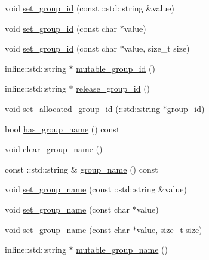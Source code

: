 \begin{DoxyCompactItemize}
\item 
void \hyperlink{class_i_m_1_1_base_define_1_1_client_group_info_ac25b09385a5addbb9d28868e7970514e}{set\+\_\+group\+\_\+id} (const \+::std\+::string \&value)
\item 
void \hyperlink{class_i_m_1_1_base_define_1_1_client_group_info_ad0ebe2257dc627dbbcb9a4d5d924f2cb}{set\+\_\+group\+\_\+id} (const char $\ast$value)
\item 
void \hyperlink{class_i_m_1_1_base_define_1_1_client_group_info_ac8af503be357ccc193ebcde38ae86fcd}{set\+\_\+group\+\_\+id} (const char $\ast$value, size\+\_\+t size)
\item 
inline\+::std\+::string $\ast$ \hyperlink{class_i_m_1_1_base_define_1_1_client_group_info_ae7f4ebffae493d221e762318c0ec7c51}{mutable\+\_\+group\+\_\+id} ()
\item 
inline\+::std\+::string $\ast$ \hyperlink{class_i_m_1_1_base_define_1_1_client_group_info_a24b89add60c216169886d76516211252}{release\+\_\+group\+\_\+id} ()
\item 
void \hyperlink{class_i_m_1_1_base_define_1_1_client_group_info_a7ff76a7c3c32bae9aa641df3a87e7b0e}{set\+\_\+allocated\+\_\+group\+\_\+id} (\+::std\+::string $\ast$\hyperlink{class_i_m_1_1_base_define_1_1_client_group_info_af803ccefa3b9c1e5ab16463f3eb9651e}{group\+\_\+id})
\item 
bool \hyperlink{class_i_m_1_1_base_define_1_1_client_group_info_a605c07708797f7b3347e385a4957a5dc}{has\+\_\+group\+\_\+name} () const 
\item 
void \hyperlink{class_i_m_1_1_base_define_1_1_client_group_info_a82d7bb5dbe1b50bb234113e0ae0f1577}{clear\+\_\+group\+\_\+name} ()
\item 
const \+::std\+::string \& \hyperlink{class_i_m_1_1_base_define_1_1_client_group_info_a63659cf89464b7b407fd30d261f8e35a}{group\+\_\+name} () const 
\item 
void \hyperlink{class_i_m_1_1_base_define_1_1_client_group_info_af276d3dade4bc188e519df90560ab2a2}{set\+\_\+group\+\_\+name} (const \+::std\+::string \&value)
\item 
void \hyperlink{class_i_m_1_1_base_define_1_1_client_group_info_a307cd3f55fac271b502eb201dd38da2c}{set\+\_\+group\+\_\+name} (const char $\ast$value)
\item 
void \hyperlink{class_i_m_1_1_base_define_1_1_client_group_info_a666dddbf2b07717cd4a5a95efb50a0d3}{set\+\_\+group\+\_\+name} (const char $\ast$value, size\+\_\+t size)
\item 
inline\+::std\+::string $\ast$ \hyperlink{class_i_m_1_1_base_define_1_1_client_group_info_a208cf9d282671b1485dace984337b00e}{mutable\+\_\+group\+\_\+name} ()

\end{DoxyCompactItemize}

